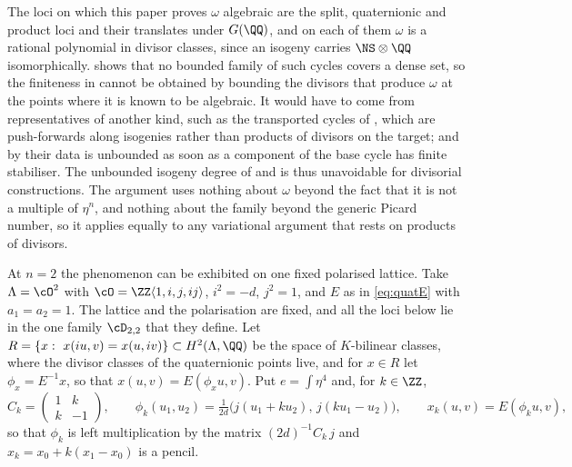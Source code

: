 \begin{remark}\label{rem:divroute}
The loci on which this paper proves $\omega$ algebraic are the split,
quaternionic and product loci and their translates under $G(\QQ)$, and on
each of them $\omega$ is a rational polynomial in divisor classes, since an
isogeny carries $\NS\otimes\QQ$ isomorphically.  shows
that no bounded family of such cycles covers a dense set, so the finiteness
in  cannot be obtained by bounding the divisors that
produce $\omega$ at the points where it is known to be algebraic. It would
have to come from representatives of another kind, such as the transported
cycles of , which are push-forwards along isogenies
rather than products of divisors on the target; and by 
their data is unbounded as soon as a component of the base cycle has finite
stabiliser. The unbounded isogeny degree of  and
 is thus unavoidable for divisorial constructions.
The argument uses nothing about $\omega$ beyond the fact that it is not a
multiple of $\eta^{n}$, and nothing about the family beyond the generic
Picard number, so it applies equally to any variational argument that rests
on products of divisors.
\end{remark}

At $n=2$ the phenomenon can be exhibited on one fixed polarised lattice. Take
$\Lambda=\cO^{2}$ with $\cO=\ZZ\langle1,i,j,ij\rangle$, $i^{2}=-d$, $j^{2}=1$,
and $E$ as in \eqref{eq:quatE} with $a_{1}=a_{2}=1$. The lattice and the
polarisation are fixed, and all the loci below lie in the one family
$\cD_{2,2}$ that they define. Let
$R=\{x:\ x(iu,v)=x(u,iv)\}\subset H^{2}(\Lambda,\QQ)$ be the space of
$K$-bilinear classes, where the divisor classes of the quaternionic points
live, and for $x\in R$ let $\phi_{x}=E^{-1}x$, so that $x(u,v)=E(\phi_{x}u,v)$.
Put $e=\int\eta^{4}$ and, for $k\in\ZZ$,
\[
  C_{k}=\begin{pmatrix}1&k\\k&-1\end{pmatrix},\qquad
  \phi_{k}(u_{1},u_{2})=\tfrac{1}{2d}\bigl(j(u_{1}+ku_{2}),\,j(ku_{1}-u_{2})\bigr),
  \qquad x_{k}(u,v)=E(\phi_{k}u,v),
\]
so that $\phi_{k}$ is left multiplication by the matrix $(2d)^{-1}C_{k}\,j$
and $x_{k}=x_{0}+k(x_{1}-x_{0})$ is a pencil.

